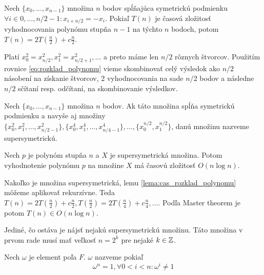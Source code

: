 \begin{lema}
  Nech $\{x_0, \dots, x_{n-1}\}$ množina $n$ bodov spĺňajúca symetrickú
  podmienku $\forall i \in 0,\dots,n/2-1: x_{i+n/2}=-x_i $.
  Pokiaľ $T(n)$ je časová zložitosť vyhodnocovania polynómu stupňa
  $n-1$ na týchto $n$ bodoch, potom
  $T(n) = 2 T(\frac{n}{2}) + c \frac{n}{2}$.
  \label{lema:cas_rozklad_polynomu}
\end{lema}
\begin{dokaz}
  Platí $x_0^2 = x_{n/2}^2, x_1^2 = x_{n/2+1}^2, \dots$ a preto
  máme len $n/2$ rôznych štvorcov. Použitím rovnice
  \ref{eq:rozklad_polynomu} vieme skombinovať celý výsledok ako
  $n/2$ násobení na získanie štvorcov,  2 vyhodnocovania na sade $n/2$
  bodov a následne $n/2$ sčítaní resp. odčítaní, na skombinovanie
  výsledkov.
\end{dokaz}

\begin{definicia}
  Nech $\{x_0, \dots, x_{n-1}\}$ množina $n$ bodov.
  Ak táto množina spĺňa symetrickú podmienku a navyše aj množiny
  $\{x_0^2, x_1^2, \dots, x_{n/2-1}^2 \},
   \{x_0^4, x_1^4, \dots, x_{n/4-1}^4\}, \dots, \{x_0^{n/2},
   x_1^{n/2}\}$, danú množinu nazveme supersymetrickú.
\end{definicia}

\begin{lema}
    Nech $p$ je polynóm stupňa $n$ a $X$ je supersymetrická množina.
    Potom vyhodnotenie polynómu $p$ na množine $X$ má časovú zložitosť
    $O(n\log n)$.
\end{lema}
\begin{dokaz}
  Nakoľko je množina supersymetrická, lemu
  \ref{lema:cas_rozklad_polynomu} môžeme aplikovať rekurzívne.
  Teda
  $T(n) = 2 T(\frac{n}{2}) + c \frac{n}{2},
   T(\frac{n}{2}) = 2 T(\frac{n}{4}) + c \frac{n}{4}, \dots$.
  Podľa Master theorem je potom $T(n) \in O(n\log n)$.
\end{dokaz}

Jediné, čo ostáva je nájsť nejakú supersymetrickú množinu. Táto
množina v prvom rade musí mať veľkosť $n=2^k$ pre nejaké $k\in\mathbb{Z}$.

\begin{definicia}
  Nech $\omega$ je element poľa $F$. $\omega$ nazveme  pokiaľ
  \begin{equation}
    \omega^n = 1, \forall 0<i<n: \omega^i\not=1
  \end{equation}
\end{definicia}

